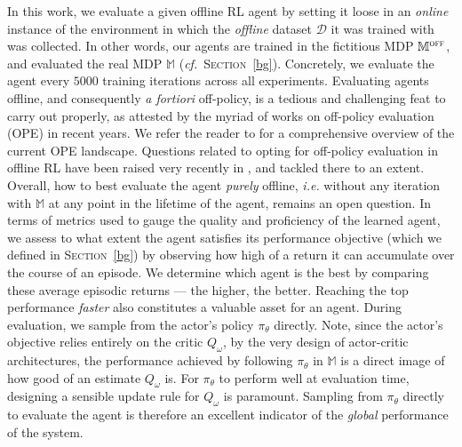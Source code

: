 In this work, we evaluate a given offline RL agent by setting it loose in an \emph{online} instance of the
environment in which the \emph{offline} dataset $\mathcal{D}$ it was trained with was collected.
In other words, our agents are trained in the fictitious MDP $\mathbb{M}^\textsc{off}$,
and evaluated the real MDP $\mathbb{M}$ (\textit{cf.}~\textsc{Section}~\ref{bg}).
Concretely, we evaluate the agent every $5000$ training iterations across all experiments.
Evaluating agents offline, and consequently \textit{a fortiori} off-policy,
is a tedious and challenging feat to carry out properly, as attested by the myriad of works on
off-policy evaluation (OPE) in recent years. We refer the reader to \cite{Voloshin2019-oi}
for a comprehensive overview of the current OPE landscape.
Questions related to opting for off-policy evaluation in offline RL have been raised very recently in
\cite{Le_Paine2020-sb},
and tackled there to an extent.
Overall, how to best evaluate the agent \emph{purely} offline,
\textit{i.e.} without any iteration with $\mathbb{M}$
at any point in the lifetime of the agent, remains an open question.
In terms of metrics used to gauge the quality and proficiency of the learned agent,
we assess to what extent the agent satisfies its performance objective
(which we defined in \textsc{Section}~\ref{bg})
by observing how high of a return it can accumulate over the course of an episode.
We determine which agent is the best by comparing these average episodic returns ---
the higher, the better. Reaching the top performance \emph{faster} also constitutes a valuable asset for
an agent.
During evaluation, we sample from the actor's policy $\pi_\theta$ directly.
Note, since the actor's objective relies entirely on the critic $Q_\omega$,
by the very design of actor-critic architectures, the performance achieved by following $\pi_\theta$ in $\mathbb{M}$
is a direct image of how good of an estimate $Q_\omega$ is.
For $\pi_\theta$ to perform well at evaluation time, designing a sensible update rule for $Q_\omega$ is
paramount. Sampling from $\pi_\theta$ directly to evaluate the agent is therefore an excellent indicator
of the \emph{global} performance of the system.

